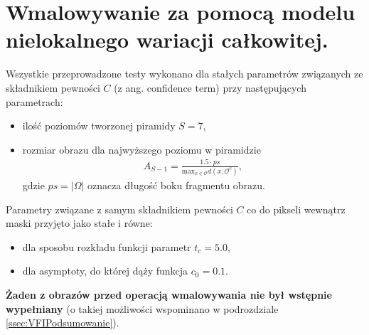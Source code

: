 \documentclass[a4paper,12pt,twoside,openany]{report}
\begin{document}
\section{Wmalowywanie za pomocą modelu nielokalnego wariacji całkowitej.}
Wszystkie przeprowadzone testy wykonano dla stałych parametrów związanych ze składnikiem pewności $C$ (z ang. confidence term) przy następujących parametrach:
\begin{itemize}
\item
ilość poziomów tworzonej piramidy $S=7$,
\item
rozmiar obrazu dla najwyższego poziomu w piramidzie 
\begin{align}
A_{S-1}=\frac{1.5 \cdot ps}{\mathrm{max}_{x \in \mathcal{O}}d(x,\mathcal{O}^{c})}
,
\end{align}
gdzie $ps = |\Omega|$ oznacza długość boku fragmentu obrazu.
\end{itemize}
Parametry związane z samym składnikiem pewności $C$ co do pikseli wewnątrz maski przyjęto jako stałe i równe:
\begin{itemize}
\item
dla sposobu rozkładu funkcji parametr $t_{c}=5.0$,
\item 
dla asymptoty, do której dąży funkcja $c_{0}=0.1$.
\end{itemize}
\textbf{Żaden z obrazów przed operacją wmalowywania nie był wstępnie wypełniany} (o takiej możliwości wspominano w podrozdziale \ref{ssec:VFIPodsumowanie}).
\end{document}
